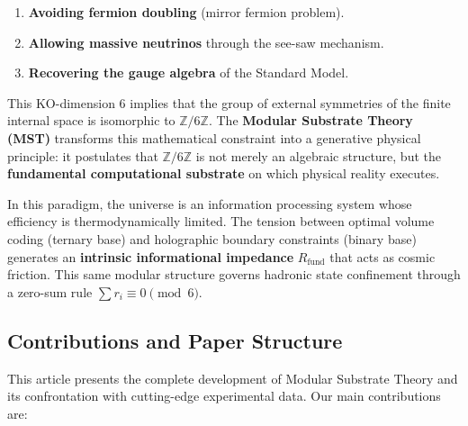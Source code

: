 \documentclass[11pt, a4paper]{article}
\theoremstyle{plain}
\theoremstyle{definition}
\newcommand{\Rfactor}{R_{\text{fund}}}
\begin{document}
\begin{enumerate}
    \item \textbf{Avoiding fermion doubling} (mirror fermion problem).
    \item \textbf{Allowing massive neutrinos} through the see-saw mechanism.
    \item \textbf{Recovering the gauge algebra} of the Standard Model.
\end{enumerate}

This KO-dimension 6 implies that the group of external symmetries of the finite internal space is isomorphic to $\mathbb{Z}/6\mathbb{Z}$. The \textbf{Modular Substrate Theory (MST)} transforms this mathematical constraint into a generative physical principle: it postulates that $\mathbb{Z}/6\mathbb{Z}$ is not merely an algebraic structure, but the \textbf{fundamental computational substrate} on which physical reality executes.

In this paradigm, the universe is an information processing system whose efficiency is thermodynamically limited. The tension between optimal volume coding (ternary base) and holographic boundary constraints (binary base) generates an \textbf{intrinsic informational impedance} $\Rfactor$ that acts as cosmic friction. This same modular structure governs hadronic state confinement through a zero-sum rule $\sum r_i \equiv 0 \pmod{6}$.

\subsection{Contributions and Paper Structure}

This article presents the complete development of Modular Substrate Theory and its confrontation with cutting-edge experimental data. Our main contributions are:
\end{document}
